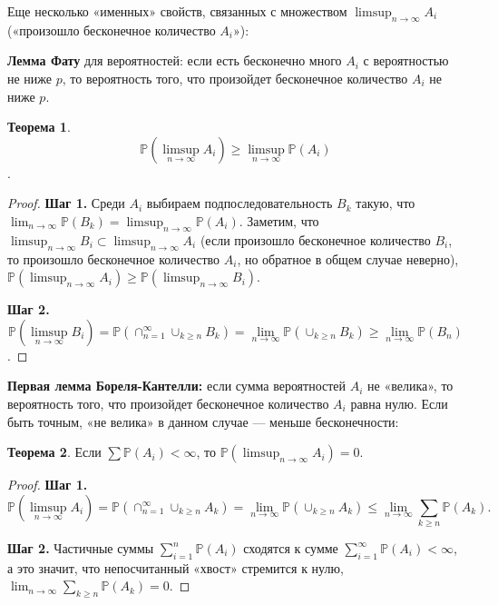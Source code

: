 \documentclass[pdftex, 12pt, a4paper]{article}
\def \mbb{\mathbb}
\def \PP{\mbb{P}}
\renewcommand{\to}{\rightarrow}
\renewcommand{\ge}{\geqslant}
\renewcommand{\leq}{\leqslant}
\renewcommand{\geq}{\geqslant}
\theoremstyle{definition} %
\newtheorem{myth}{Теорема}
\numberwithin{problem}{section}
\numberwithin{blits}{section}
\begin{document}
Еще несколько «именных» свойств, связанных с множеством $\displaystyle \limsup_{n \to \infty} A_{i}$ («произошло бесконечное количество $A_{i}$»):

\textbf{Лемма Фату}  для вероятностей: если есть бесконечно много $A_{i}$ с вероятностью не ниже $p$, то вероятность того, что произойдет бесконечное количество $A_{i}$ не ниже $p$.

\begin{myth} \[\PP(\limsup_{n \to \infty} A_{i}) \ge \limsup_{n \to \infty} \PP(A_{i})\].
\end{myth}
\begin{proof} \textbf{Шаг 1.} Среди $A_{i}$ выбираем подпоследовательность $B_{k}$ такую, что $\displaystyle \lim_{n \to \infty} \PP(B_{k})=\limsup_{n \to \infty} \PP(A_{i})$. Заметим, что $\displaystyle \limsup_{n \to \infty} B_{i}\subset\limsup_{n \to \infty} A_{i}$ (если произошло бесконечное количество $B_{i}$, то произошло бесконечное количество $A_{i}$, но обратное в общем случае неверно), $\displaystyle \PP(\limsup_{n \to \infty} A_{i})\ge \PP(\limsup_{n \to \infty} B_{i})$.

\textbf{Шаг 2.} \[\PP(\limsup_{n \to \infty} B_{i})=\PP(\cap_{n=1}^{\infty}\cup_{k\ge n} B_{k})=\lim_{n\to\infty} \PP(\cup_{k\ge n} B_{k})\ge \lim_{n\to\infty} \PP(B_{n})\].
\end{proof}

\textbf{Первая лемма Бореля-Кантелли:}  если сумма вероятностей $A_{i}$ не «велика», то вероятность того, что произойдет бесконечное количество $A_{i}$ равна нулю. Если быть точным, «не велика» в данном случае --- меньше бесконечности:

\begin{myth} Если $\sum \PP(A_{i})<\infty$, то $\displaystyle \PP(\limsup_{n \to \infty} A_{i})=0$.
\end{myth}
\begin{proof} \textbf{Шаг 1.} \[\PP(\limsup_{n\to \infty} A_{i})=\PP(\cap_{n=1}^{\infty}\cup_{k\geq n} A_{k})=\lim_{n\to\infty} \PP(\cup_{k\geq n} A_{k})\leq \lim_{n\to\infty}\sum_{k\geq n} \PP(A_{k}).\]

\textbf{Шаг 2.} Частичные суммы $\sum_{i=1}^{n}\PP(A_{i})$ сходятся к сумме $\sum_{i=1}^{\infty}\PP(A_{i})<\infty$, а это значит, что непосчитанный «хвост» стремится к нулю, $\displaystyle \lim_{n\to\infty}\sum_{k\geq n} \PP(A_{k})=0$.
\end{proof}
\end{document}
